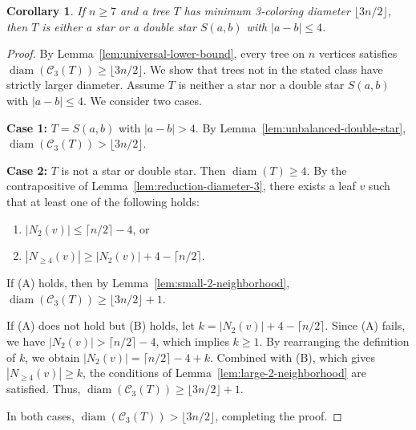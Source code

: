 \documentclass[12pt,reqno]{amsart}
\newtheorem{cor}[thm]{Corollary}
\theoremstyle{definition}
\newcommand{\C}{\mathcal{C}}
\newcommand{\diam}{\operatorname{diam}}
\begin{document}
\begin{cor}\label{cor:minimum-3-coloring-diameter}
If $n \ge 7$ and a tree $T$ has minimum 3-coloring diameter $\lfloor 3n/2\rfloor$, then $T$ is either a star or a double star $S(a,b)$ with $|a-b|\le 4$.
\end{cor}
\begin{proof}
By Lemma~\ref{lem:universal-lower-bound}, every tree on $n$ vertices satisfies $\diam(\C_3(T)) \ge \lfloor 3n/2 \rfloor$. We show that trees not in the stated class have strictly larger diameter. Assume $T$ is neither a star nor a double star $S(a,b)$ with $|a-b|\le 4$. We consider two cases.

\textbf{Case 1:} $T = S(a,b)$ with $|a-b| > 4$. By Lemma~\ref{lem:unbalanced-double-star}, $\diam(\C_3(T)) > \lfloor 3n/2 \rfloor$.

\textbf{Case 2:} $T$ is not a star or double star. Then $\diam(T) \ge 4$. By the contrapositive of Lemma~\ref{lem:reduction-diameter-3}, there exists a leaf $v$ such that at least one of the following holds:
\begin{enumerate}
    \item[(A)] $|N_2(v)| \le \lceil n/2 \rceil - 4$, or
    \item[(B)] $|N_{\ge 4}(v)| \ge |N_2(v)| + 4 - \lceil n/2 \rceil$.
\end{enumerate}

If (A) holds, then by Lemma~\ref{lem:small-2-neighborhood}, $\diam(\C_3(T)) \ge \lfloor 3n/2 \rfloor + 1$.

If (A) does not hold but (B) holds, let $k = |N_2(v)| + 4 - \lceil n/2 \rceil$. Since (A) fails, we have $|N_2(v)| > \lceil n/2 \rceil - 4$, which implies $k \ge 1$. By rearranging the definition of $k$, we obtain $|N_2(v)| = \lceil n/2 \rceil - 4 + k$. Combined with (B), which gives $|N_{\ge 4}(v)| \ge k$, the conditions of Lemma~\ref{lem:large-2-neighborhood} are satisfied. Thus, $\diam(\C_3(T)) \ge \lfloor 3n/2 \rfloor + 1$.

In both cases, $\diam(\C_3(T)) > \lfloor 3n/2 \rfloor$, completing the proof.
\end{proof}
\end{document}
